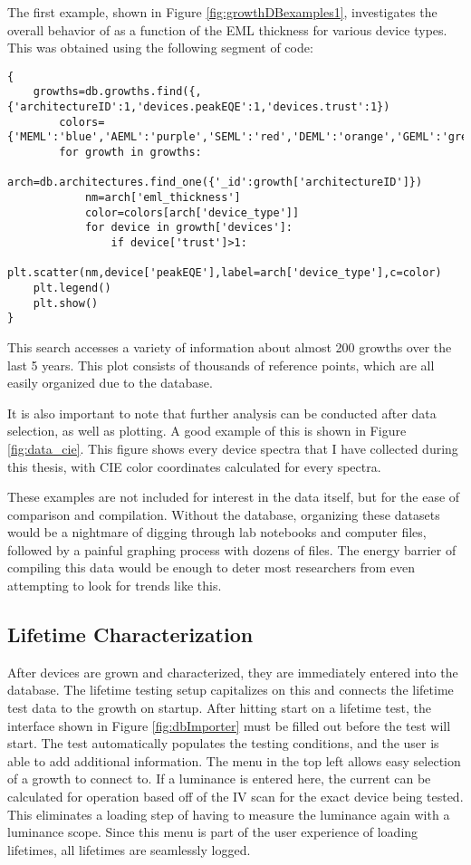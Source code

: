 \documentclass[../thesis.tex]{subfiles}
\begin{document}
The first example, shown in Figure \ref{fig:growthDBexamples1}, investigates the overall behavior of \eqe as a function of the EML thickness for various device types.
This was obtained using the following segment of code:

\begin{lstlisting}
{
    growths=db.growths.find({,{'architectureID':1,'devices.peakEQE':1,'devices.trust':1})
        colors={'MEML':'blue','AEML':'purple','SEML':'red','DEML':'orange','GEML':'green'}
        for growth in growths:
            arch=db.architectures.find_one({'_id':growth['architectureID']})
            nm=arch['eml_thickness']
            color=colors[arch['device_type']]
            for device in growth['devices']:
                if device['trust']>1:
                    plt.scatter(nm,device['peakEQE'],label=arch['device_type'],c=color)
    plt.legend()
    plt.show()
}
\end{lstlisting}

This search accesses a variety of information about almost 200 growths over the last 5 years.
This plot consists of thousands of reference points, which are all easily organized due to the database.

It is also important to note that further analysis can be conducted after data selection, as well as plotting.
A good example of this is shown in Figure \ref{fig:data_cie}.
This figure shows every device spectra that I have collected during this thesis, with CIE color coordinates calculated for every spectra.

These examples are not included for interest in the data itself, but for the ease of comparison and compilation.
Without the database, organizing these datasets would be a nightmare of digging through lab notebooks and computer files, followed by a painful graphing process with dozens of files.
The energy barrier of compiling this data would be enough to deter most researchers from even attempting to look for trends like this.

\subsection{Lifetime Characterization}

After devices are grown and characterized, they are immediately entered into the database.  
The lifetime testing setup capitalizes on this and connects the lifetime test data to the growth on startup.
After hitting start on a lifetime test, the interface shown in Figure \ref{fig:dbImporter} must be filled out before the test will start.  
The test automatically populates the testing conditions, and the user is able to add additional information.
The menu in the top left allows easy selection of a growth to connect to.  
If a luminance is entered here, the current can be calculated for operation based off of the IV scan for the exact device being tested.
This eliminates a loading step of having to measure the luminance again with a luminance scope.
Since this menu is part of the user experience of loading lifetimes, all lifetimes are seamlessly logged.
\end{document}
